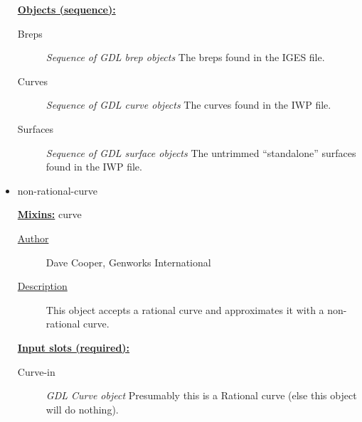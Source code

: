 \documentclass [11pt]{book}
\begin{document}
\begin{itemize}
\begin{description}
\end{description}






\textbf{
\underline{Objects (sequence):}}

\begin{description}

\item [Breps]
\emph{Sequence of GDL brep objects} The breps found in the IGES file.


\item [Curves]
\emph{Sequence of GDL curve objects} The curves found in the IWP file.


\item [Surfaces]
\emph{Sequence of GDL surface objects} The untrimmed ``standalone'' surfaces found in the IWP file.


\end{description}







\item {}non-rational-curve


\textbf{
\underline{Mixins:}} curve





\begin{description}

\item [
\underline{Author}]


Dave Cooper, Genworks International



\item [
\underline{Description}]


This object accepts a rational curve and approximates it with a non-rational curve.



\end{description}








\textbf{
\underline{Input slots (required):}}

\begin{description}

\item [Curve-in]
\emph{GDL Curve object} Presumably this is a Rational curve (else this object will do nothing).



\end{description}
\end{itemize}
\end{document}
